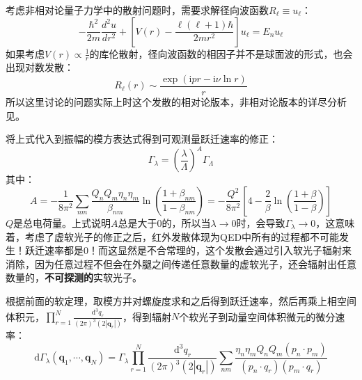 \begin{remark}
	考虑非相对论量子力学中的散射问题时，需要求解径向波函数$R_\ell\equiv u_\ell$：
	\[-\frac{\hbar^2}{2m}\frac{d^2u}{dr^2}+\left[V(r)-\frac{\ell(\ell+1)\hbar}{2mr^2}\right]u_\ell=E_n u_\ell\]
	如果考虑$V(r)\propto\frac{1}{r}$的库伦散射，径向波函数的相因子并不是球面波的形式，也会出现对数发散：
	\[R_\ell(r)\sim\frac{\exp(\mathrm{i}pr-\mathrm{i}\nu\ln r)}{r}\]
	所以这里讨论的问题实际上时这个发散的相对论版本，非相对论版本的详尽分析见\cite{Schiff_1968}。
\end{remark}
将上式代入到振幅的模方表达式得到可观测量跃迁速率的修正：
\begin{equation}\label{23.5}
	\Gamma_{\lambda}=\left(\frac{\lambda}{\Lambda}\right)^{A}\Gamma_{\Lambda}
\end{equation}
其中：
\begin{equation}\label{23.6}
	A=-\frac{1}{8\pi^2}\sum_{nm}\frac{Q_nQ_m\eta_n\eta_m}{\beta_{nm}}\ln\left(\frac{1+\beta_{nm}}{1-\beta_{nm}}\right)=-\frac{Q^{2}}{8\pi^{2}}\left[4-\frac{2}{\beta}\ln\left(\frac{1+\beta}{1-\beta}\right)\right]
\end{equation}
$Q$是总电荷量。上式说明$A$总是大于0的，所以当$\lambda\to0$时，会导致$\Gamma_{\lambda}\to 0$，这意味着，考虑了虚软光子的修正之后，红外发散体现为QED中所有的过程都不可能发生！跃迁速率都是0！而这显然是不合常理的，这个发散会通过引入软光子辐射来消除，因为任意过程不但会在外腿之间传递任意数量的虚软光子，还会辐射出任意数量的，\textbf{不可探测的}实软光子。

根据前面的软定理，取模方并对螺旋度求和之后得到跃迁速率，然后再乘上相空间体积元，$\prod_{r=1}^N\frac{\mathrm{d}^3q_r}{(2\pi)^3(2|\mathbf{q}_r|)}$，得到辐射$N$个软光子到动量空间体积微元的微分速率：
\begin{equation}
	\mathrm d\Gamma_{\lambda}(\mathbf q_1,\cdots,\mathbf q_N)=\Gamma_{\lambda}\prod_{r=1}^{N}\frac{\mathrm d^3q_r}{(2\pi)^3(2|\mathbf q_r|)}\sum_{nm}\frac{\eta_n\eta_mQ_nQ_m(p_n\cdot p_m)}{(p_n\cdot q_r)(p_m\cdot q_r)}
\end{equation}

